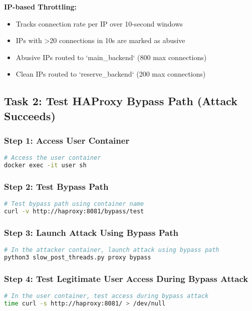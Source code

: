 \documentclass[12pt]{article}
\begin{document}
\textbf{IP-based Throttling:}
\begin{itemize}
    \item Tracks connection rate per IP over 10-second windows
    \item IPs with >20 connections in 10s are marked as abusive
    \item Abusive IPs routed to `main_backend` (800 max connections)
    \item Clean IPs routed to `reserve_backend` (200 max connections)
\end{itemize}

\subsection{Task 2: Test HAProxy Bypass Path (Attack Succeeds)}

\subsubsection{Step 1: Access User Container}
\begin{lstlisting}[language=bash]
# Access the user container
docker exec -it user sh
\end{lstlisting}

\subsubsection{Step 2: Test Bypass Path}
\begin{lstlisting}[language=bash]
# Test bypass path using container name
curl -v http://haproxy:8081/bypass/test
\end{lstlisting}

\subsubsection{Step 3: Launch Attack Using Bypass Path}
\begin{lstlisting}[language=bash]
# In the attacker container, launch attack using bypass path
python3 slow_post_threads.py proxy bypass
\end{lstlisting}

\subsubsection{Step 4: Test Legitimate User Access During Bypass Attack}
\begin{lstlisting}[language=bash]
# In the user container, test access during bypass attack
time curl -s http://haproxy:8081/ > /dev/null
\end{lstlisting}
\end{document}
